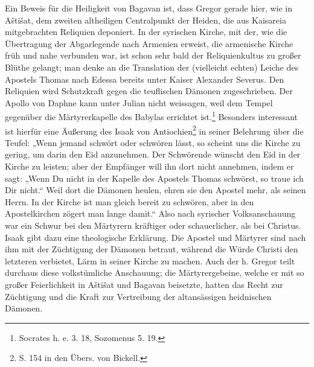 \documentclass{article}
\begin{document}
Ein Beweis für die Heiligkeit von Bagavan ist, dass Gregor gerade hier, wie in Aštišat, dem zweiten altheiligen Centralpunkt der Heiden, die aus Kaisareia mitgebrachten Reliquien deponiert. In der syrischen Kirche, mit der, wie die Übertragung der Abgarlegende nach Armenien erweist, die armenische Kirche früh und nahe verbunden war, ist schon sehr bald der Reliquienkultus zu großer Blüthe gelangt; man denke an die Translation der (vielleicht echten) Leiche des Apostels Thomas nach Edessa bereits unter Kaiser Alexander Severus. Den Reliquien wird Schutzkraft gegen die teuflischen Dämonen zugeschrieben. Der Apollo von Daphne kann unter Julian nicht weissagen, weil dem Tempel gegenüber die Märtyrerkapelle des Babylas errichtet ist.\footnote{Socrates h. e. 3. 18, Sozomenus 5. 19.} Besonders interessant ist hierfür eine Äußerung des Isaak von Antiochien\footnote{S. 154 in den Übers. von Bickell.} in seiner Belehrung über die Teufel: „Wenn jemand schwört oder schwören lässt, so scheint uns die Kirche zu gering, um darin den Eid anzunehmen. Der Schwörende wünscht den Eid in der Kirche zu leisten; aber der Empfänger will ihn dort nicht annehmen, indem er sagt: „Wenn Du nicht in der Kapelle des Apostels Thomas schwörst, so traue ich Dir nicht.“ Weil dort die Dämonen heulen, ehren sie den Apostel mehr, als seinen Herrn. In der Kirche ist man gleich bereit zu schwören, aber in den Apostelkirchen zögert man lange damit.“ Also nach syrischer Volksanschauung war ein Schwur bei den Märtyrern kräftiger oder schauerlicher, als bei Christus. Isaak gibt dazu eine theologische Erklärung. Die Apostel und Märtyrer sind nach ihm mit der Züchtigung der Dämonen betraut, während die Würde Christi den letzteren verbietet, Lärm in seiner Kirche zu machen. Auch der h. Gregor teilt durchaus diese volkstümliche Anschauung; die Märtyrergebeine, welche er mit so großer Feierlichkeit in Aštišat und Bagavan beisetzte, hatten das Recht zur Züchtigung und die Kraft zur Vertreibung der altansässigen heidnischen Dämonen.
\end{document}
